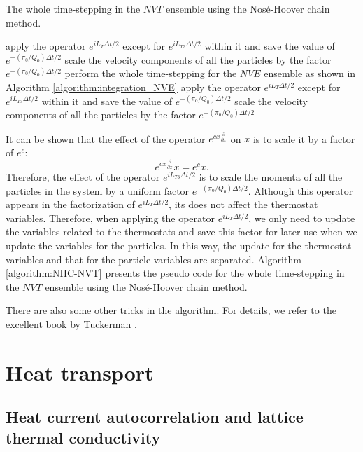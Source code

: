 \documentclass[12pt,a4paper]{report}
\begin{document}
\begin{algorithm}[htb]
\caption{The whole time-stepping in the $NVT$ ensemble using the Nos\'{e}-Hoover chain method. }
\label{algorithm:NHC-NVT}
\begin{algorithmic}[1]
\State apply the operator $e^{iL_{T}\Delta t/2}$ except for $e^{iL_{T3}\Delta t/2}$ within it and save the value of $e^{-(\pi_0/Q_0)\Delta t/2}$
\State scale the velocity components of all the particles by the factor $e^{-(\pi_0/Q_0)\Delta t/2}$
\State perform the whole time-stepping for the $NVE$ ensemble as shown in Algorithm \ref{algorithm:integration_NVE}
\State apply the operator $e^{iL_{T}\Delta t/2}$ except for $e^{iL_{T3}\Delta t/2}$ within it and save the value of $e^{-(\pi_0/Q_0)\Delta t/2}$
\State scale the velocity components of all the particles by the factor $e^{-(\pi_0/Q_0)\Delta t/2}$
\end{algorithmic}
\end{algorithm}


It can be shown that the effect of the operator $e^{cx\frac{\partial}{\partial x}}$ on $x$ is to scale it by a factor of $e^c$:
\begin{equation}
e^{cx\frac{\partial}{\partial x}} x = e^c x.
\end{equation}
Therefore, the effect of the operator $e^{iL_{T3}\Delta t/2}$ is to scale the momenta of all the particles in the system by a uniform factor $e^{-(\pi_0/Q_0)\Delta t/2}$. Although this operator appears in the factorization of $e^{iL_{T}\Delta t/2}$, its does not affect the thermostat variables. Therefore, when applying the operator $e^{iL_{T}\Delta t/2}$, we only need to update the variables related to the thermostats and save this factor for later use when we update the variables for the particles. In this way, the update for the thermostat variables and that for the particle variables are separated. Algorithm \ref{algorithm:NHC-NVT} presents the pseudo code for the whole time-stepping in the $NVT$ ensemble using the Nos\'{e}-Hoover chain method.

There are also some other tricks in the algorithm. For details, we refer to the excellent book by Tuckerman \cite{tuckerman2010}.




\section{Heat transport}



\subsection{Heat current autocorrelation and lattice thermal conductivity}
\end{document}
